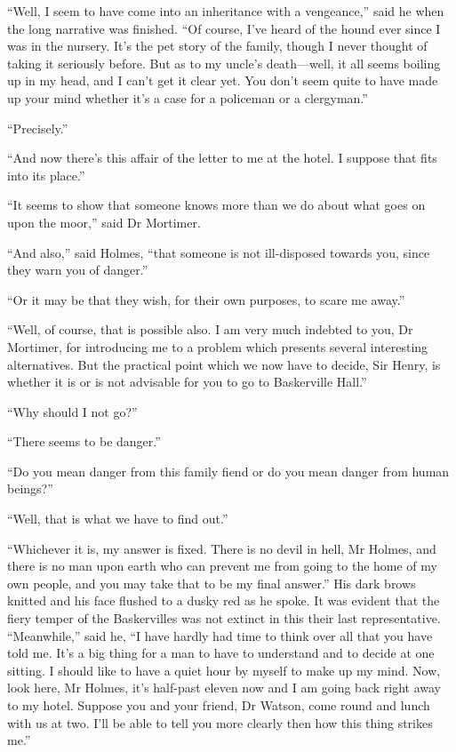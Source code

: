 \documentclass[paper=5.5in:8.5in,BCOR=7mm,twoside,DIV=calc,12pt,usegeometry,openany,chapterprefix,endperiod]{scrbook} %
\begin{document}
\enquote{Well, I seem to have come into an inheritance with a vengeance,} said he when the long narrative was finished. \enquote{Of course, I've heard of the hound ever since I was in the nursery. It's the pet story of the family, though I never thought of taking it seriously before. But as to my uncle's death\nobreakdash---well, it all seems boiling up in my head, and I can't get it clear yet. You don't seem quite to have made up your mind whether it's a case for a policeman or a clergyman.}

\enquote{Precisely.}

\enquote{And now there's this affair of the letter to me at the hotel. I suppose that fits into its place.}

\enquote{It seems to show that someone knows more than we do about what goes on upon the moor,} said Dr Mortimer.

\enquote{And also,} said Holmes, \enquote{that someone is not ill-disposed towards you, since they warn you of danger.}

\enquote{Or it may be that they wish, for their own purposes, to scare me away.}

\enquote{Well, of course, that is possible also. I am very much indebted to you, Dr Mortimer, for introducing me to a problem which presents several interesting alternatives. But the practical point which we now have to decide, Sir Henry, is whether it is or is not advisable for you to go to Baskerville Hall.}

\enquote{Why should I not go?}

\enquote{There seems to be danger.}

\enquote{Do you mean danger from this family fiend or do you mean danger from human beings?}

\enquote{Well, that is what we have to find out.}

\enquote{Whichever it is, my answer is fixed. There is no devil in hell, Mr Holmes, and there is no man upon earth who can prevent me from going to the home of my own people, and you may take that to be my final answer.} His dark brows knitted and his face flushed to a dusky red as he spoke. It was evident that the fiery temper of the Baskervilles was not extinct in this their last representative. \enquote{Meanwhile,} said he, \enquote{I have hardly had time to think over all that you have told me. It's a big thing for a man to have to understand and to decide at one sitting. I should like to have a quiet hour by myself to make up my mind. Now, look here, Mr Holmes, it's half-past eleven now and I am going back right away to my hotel. Suppose you and your friend, Dr Watson, come round and lunch with us at two. I'll be able to tell you more clearly then how this thing strikes me.}
\end{document}
